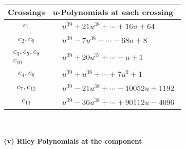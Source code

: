 \documentclass[1p]{elsarticle_modified}
\theoremstyle{definition}
\begin{document}
\begin{tabular}{m{50pt}|m{274pt}}
Crossings & \hspace{64pt}u-Polynomials at each crossing \\
\hline $$\begin{aligned}c_{1}\end{aligned}$$&$\begin{aligned}
&u^{39}+21 u^{38}+\cdots+16 u+64
\end{aligned}$\\
\hline $$\begin{aligned}c_{2},c_{6}\end{aligned}$$&$\begin{aligned}
&u^{39}-7 u^{38}+\cdots-68 u+8
\end{aligned}$\\
\hline $$\begin{aligned}c_{3},c_{5},c_{9}\\c_{10}\end{aligned}$$&$\begin{aligned}
&u^{39}+20 u^{37}+\cdots- u+1
\end{aligned}$\\
\hline $$\begin{aligned}c_{4},c_{8}\end{aligned}$$&$\begin{aligned}
&u^{39}+u^{38}+\cdots+7 u^2+1
\end{aligned}$\\
\hline $$\begin{aligned}c_{7},c_{12}\end{aligned}$$&$\begin{aligned}
&u^{39}-21 u^{38}+\cdots-10052 u+1192
\end{aligned}$\\
\hline $$\begin{aligned}c_{11}\end{aligned}$$&$\begin{aligned}
&u^{39}-36 u^{38}+\cdots+90112 u-4096
\end{aligned}$\\
\hline
\end{tabular}\\~\\
\newpage\renewcommand{\arraystretch}{1}
\flushleft \textbf{(v) Riley Polynomials at the component}\newline \\
\end{document}
